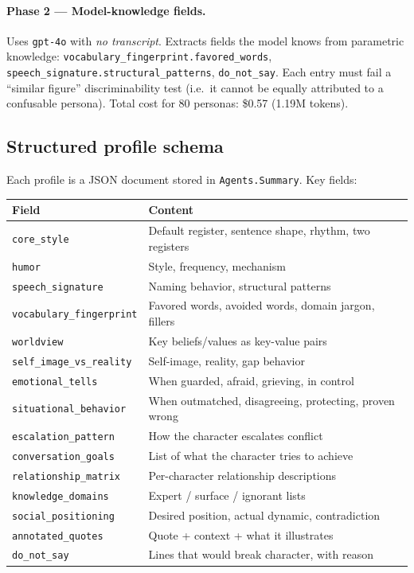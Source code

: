 \documentclass[12pt,a4paper]{article}
\begin{document}
\paragraph{Phase 2 --- Model-knowledge fields.}
Uses \texttt{gpt-4o} with \emph{no transcript}. Extracts fields the model knows from
parametric knowledge: \texttt{vocabulary\_fingerprint.favored\_words},
\texttt{speech\_signature.structural\_patterns}, \texttt{do\_not\_say}. Each entry must
fail a ``similar figure'' discriminability test (i.e.\ it cannot be equally attributed to
a confusable persona). Total cost for 80 personas: \$0.57 (1.19M tokens).

\subsection{Structured profile schema}

Each profile is a JSON document stored in \texttt{Agents.Summary}. Key fields:

\begin{longtable}{@{}ll@{}}
\toprule
\textbf{Field} & \textbf{Content} \\
\midrule
\texttt{core\_style} & Default register, sentence shape, rhythm, two registers \\
\texttt{humor} & Style, frequency, mechanism \\
\texttt{speech\_signature} & Naming behavior, structural patterns \\
\texttt{vocabulary\_fingerprint} & Favored words, avoided words, domain jargon, fillers \\
\texttt{worldview} & Key beliefs/values as key-value pairs \\
\texttt{self\_image\_vs\_reality} & Self-image, reality, gap behavior \\
\texttt{emotional\_tells} & When guarded, afraid, grieving, in control \\
\texttt{situational\_behavior} & When outmatched, disagreeing, protecting, proven wrong \\
\texttt{escalation\_pattern} & How the character escalates conflict \\
\texttt{conversation\_goals} & List of what the character tries to achieve \\
\texttt{relationship\_matrix} & Per-character relationship descriptions \\
\texttt{knowledge\_domains} & Expert / surface / ignorant lists \\
\texttt{social\_positioning} & Desired position, actual dynamic, contradiction \\
\texttt{annotated\_quotes} & Quote + context + what it illustrates \\
\texttt{do\_not\_say} & Lines that would break character, with reason \\
\bottomrule
\end{longtable}
\end{document}
